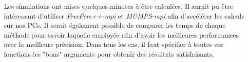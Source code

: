     Les simulations ont mises quelques minutes à être calculées. 
    Il aurait pu être intéressant d'utiliser \emph{FreeFem++-mpi} et \emph{MUMPS-mpi} afin d'accélérer les calculs sur nos PCs.
    Il serait également possible de comparer les temps de chaque méthode pour savoir laquelle employée afin d'avoir les meilleures performances avec la meilleure précision.
    Dans tous les cas, il faut spécifier à toutes ces fonctions les "bons" arguments pour obtenir des résultats satisfaisants.






